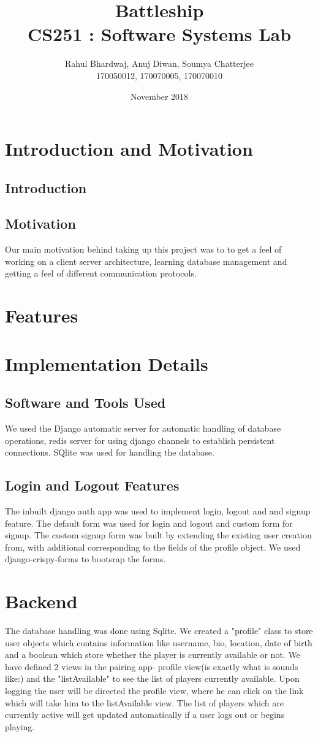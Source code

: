 \documentclass[titlepage]{article}
\title{\textbf{Battleship} \\ CS251 : Software Systems Lab}
\author{Rahul Bhardwaj, Anuj Diwan, Soumya Chatterjee \\ 170050012, 170070005, 170070010}
\date{November 2018}
\begin{document}
\maketitle

\tableofcontents

\break

\section{Introduction and Motivation}
\subsection{Introduction}
\subsection{Motivation}
Our main motivation behind taking up this project was to to get a feel of working on a client server architecture, learning database management and getting a feel of different communication protocols.

\section{Features}

\section{Implementation Details}
\subsection{Software and Tools Used}
We used the Django automatic server for automatic handling of database operations, redis server for using django channels to establish persistent connections. SQlite was used for handling the database. 
\subsection{Login and Logout Features}
The inbuilt django auth app was used to implement login, logout and and signup feature. The default form was used for login and logout and custom form for signup. The custom signup form was built by extending the existing user creation from, with additional corresponding to the fields of the profile object. We used django-crispy-forms to bootsrap the forms. 
\section{Backend}
 The database handling was done using Sqlite. We created a "profile" class to store user objects which contains information like username, bio, location, date of birth and a boolean which store whether the player is currently available or not. We have defined 2 views in the pairing app- profile view(is exactly what is sounds like:) and the "listAvailable" to see the list of players currently available. Upon logging the user will be directed the profile view, where he can click on the link which will take him to the listAvailable view. The list of players which are currently active will get updated automatically if a user logs out or begins playing. 
\end{document}
